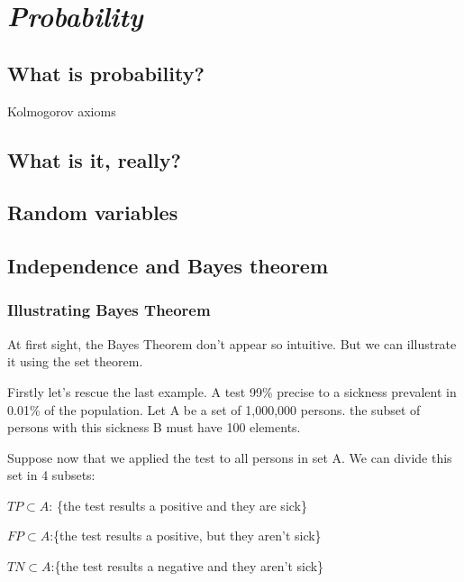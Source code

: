 \documentclass{book} %
\begin{document}
\chapter{\emph{Probability}}

\label{probability}

\section{What is probability?}
Kolmogorov axioms

\section{What is it, really?}

\section{Random variables}

\section{Independence and Bayes theorem}
\subsection{Illustrating Bayes Theorem}

At first sight, the Bayes Theorem don't appear so intuitive. But we can illustrate it using the set theorem.

Firstly let's rescue the last example. A test 99\% precise to a sickness prevalent in 0.01\% of the population. Let A be a set of 1,000,000 persons. the subset of persons with this sickness B must have 100 elements.

Suppose now that we applied the test to all persons in set A. We can divide this set in 4 subsets:

$TP \subset A$: \{the test results a positive and they are sick\}

$FP \subset A$:\{the test results a positive, but they aren't sick\}

$TN \subset A$:\{the test results a negative and they aren't sick\}
\end{document}
